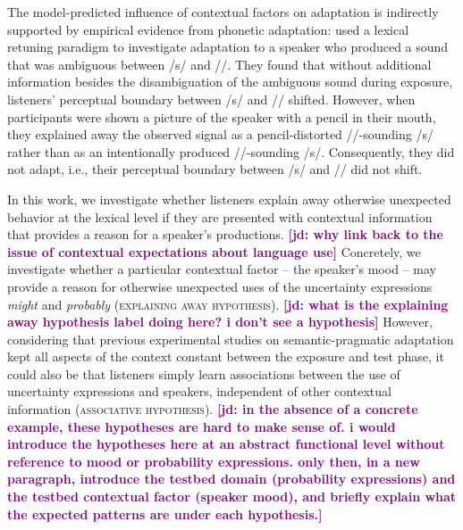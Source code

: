 \documentclass[man,floatsintext]{apa6}
\newcommand{\jd}[1]{\textcolor{Purple}{\bf [jd: #1]}}
\begin{document}
The model-predicted influence of contextual factors on adaptation is indirectly supported by empirical evidence from phonetic adaptation:  used a lexical retuning paradigm to investigate adaptation to a speaker who produced a sound that was ambiguous between /s/ and //. They found that without additional information besides the disambiguation of the ambiguous sound during exposure, listeners'  perceptual boundary between /s/ and // shifted. However, when participants were shown a picture of the speaker with a pencil in their mouth, they explained away the observed signal as a pencil-distorted //-sounding /s/ rather than as an intentionally produced //-sounding /s/. Consequently, they did not adapt, i.e., their perceptual boundary between /s/ and // did not shift.

In this work, we investigate whether listeners explain away otherwise unexpected behavior at the lexical level if they are presented with contextual information that provides a reason for a speaker's productions. \jd{why link back to the issue of contextual expectations about language use} Concretely, we investigate whether a particular contextual factor  -- the speaker's mood -- may provide a reason for otherwise unexpected uses of the uncertainty expressions \textit{might} and \textit{probably}  (\textsc{explaining away hypothesis}). \jd{what is the explaining away hypothesis label doing here? i don't see a hypothesis} However, considering that previous experimental studies on semantic-pragmatic adaptation \cite{Yildirim2016,Schuster2020} kept all aspects of the context constant between the exposure and test phase, it could also be that listeners simply learn associations between the use of uncertainty expressions and speakers, independent of other contextual information (\textsc{associative hypothesis}). \jd{in the absence of a concrete example, these hypotheses are hard to make sense of. i would introduce the hypotheses here at an abstract functional level without reference to mood or probability expressions. only then, in a new paragraph, introduce the testbed domain (probability expressions) and the testbed contextual factor (speaker mood), and briefly explain what the expected patterns are under each hypothesis.}
\end{document}
